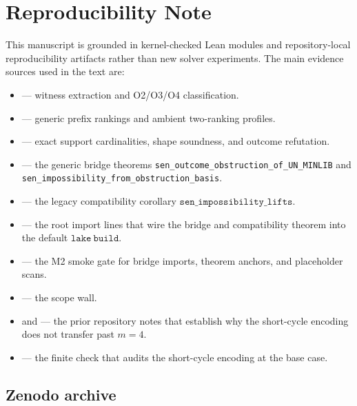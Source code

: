 \section{Reproducibility Note}
\label{sec:repro}

This manuscript is grounded in kernel-checked Lean modules and repository-local reproducibility artifacts rather than new solver experiments.
The main evidence sources used in the text are:

\begin{itemize}[leftmargin=1.5em]
\item {} --- witness extraction and O2/O3/O4 classification.
\item {} --- generic prefix rankings and ambient two-ranking profiles.
\item {} --- exact support cardinalities, shape soundness, and outcome refutation.
\item {\sloppy{} --- the generic bridge theorems \texttt{sen\_outcome\_obstruction\_of\_UN\_MINLIB} and \texttt{sen\_impossibility\_from\_obstruction\_basis}.\par}
\item {} --- the legacy compatibility corollary \(\mathtt{sen\_impossibility\_lifts}\).
\item {} --- the root import lines that wire the bridge and compatibility theorem into the default \(\mathtt{lake\ build}\).
\item {} --- the M2 smoke gate for bridge imports, theorem anchors, and placeholder scans.
\item {} --- the scope wall.
\item {} and  --- the prior repository notes that establish why the short-cycle encoding does not transfer past \(m = 4\).
\item {} --- the finite check that audits the short-cycle encoding at the base case.
\end{itemize}

\subsection{Zenodo archive}
\label{sec:zenodo-archive}

